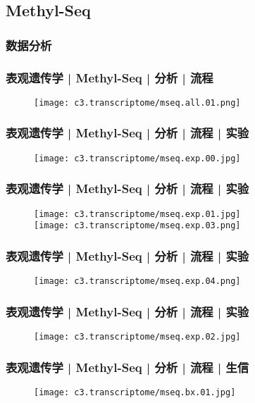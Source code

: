\subsection{Methyl-Seq}
\subsubsection{数据分析}
\begin{frame}
  \frametitle{表观遗传学 | Methyl-Seq | 分析 | 流程}
  \begin{figure}
    \centering
    \texttt{[image: c3.transcriptome/mseq.all.01.png]}
  \end{figure}
\end{frame}

\begin{frame}
  \frametitle{表观遗传学 | Methyl-Seq | 分析 | 流程 | 实验}
  \begin{figure}
    \centering
    \texttt{[image: c3.transcriptome/mseq.exp.00.jpg]}
  \end{figure}
\end{frame}

\begin{frame}
  \frametitle{表观遗传学 | Methyl-Seq | 分析 | 流程 | 实验}
  \begin{figure}
    \centering
    \texttt{[image: c3.transcriptome/mseq.exp.01.jpg]}\\
    \vspace{1em}
    \texttt{[image: c3.transcriptome/mseq.exp.03.png]}
  \end{figure}
\end{frame}

\begin{frame}
  \frametitle{表观遗传学 | Methyl-Seq | 分析 | 流程 | 实验}
  \begin{figure}
    \centering
    \texttt{[image: c3.transcriptome/mseq.exp.04.png]}
  \end{figure}
\end{frame}

\begin{frame}
  \frametitle{表观遗传学 | Methyl-Seq | 分析 | 流程 | 实验}
  \begin{figure}
    \centering
    \texttt{[image: c3.transcriptome/mseq.exp.02.jpg]}
  \end{figure}
\end{frame}

\begin{frame}
  \frametitle{表观遗传学 | Methyl-Seq | 分析 | 流程 | 生信}
  \begin{figure}
    \centering
    \texttt{[image: c3.transcriptome/mseq.bx.01.jpg]}
  \end{figure}
\end{frame}

